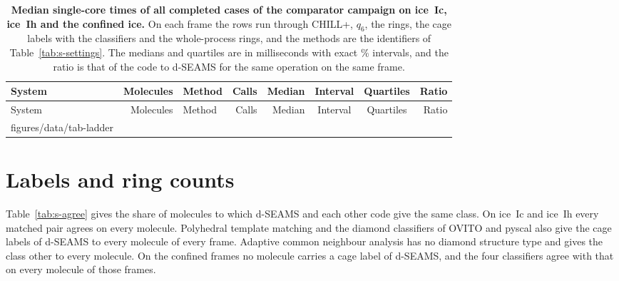 \documentclass[preprint,12pt]{elsarticle}
\makeatletter
\newcommand{\tabbody}[1]{\@@input #1 }
\makeatother
\begin{document}
\begin{landscape}
\footnotesize
\setlength{\tabcolsep}{4pt}
\setlength{\LTcapwidth}{\linewidth}
\begin{longtable}{@{}lrlrrccr@{}}
\caption{\textbf{Median single-core times of all  completed cases of the comparator campaign on ice~Ic, ice~Ih and the confined ice.}
On each frame the rows run through CHILL+, $q_6$, the rings, the cage labels with the classifiers and the whole-process rings, and the methods are the identifiers of Table~\ref{tab:s-settings}.
The medians and quartiles are in milliseconds with exact \% intervals, and the ratio is that of the code to d-SEAMS for the same operation on the same frame.}
\label{tab:s-ladder}\\
\toprule
System & Molecules & Method & Calls & Median & Interval & Quartiles & Ratio\\
\midrule
\endfirsthead
\toprule
System & Molecules & Method & Calls & Median & Interval & Quartiles & Ratio\\
\midrule
\endhead
\tabbody{figures/data/tab-ladder}
\bottomrule
\end{longtable}
\end{landscape}

\section{Labels and ring counts}
\label{sec:s-labels}

Table~\ref{tab:s-agree} gives the share of molecules to which d-SEAMS and each other code give the same class.
On ice~Ic and ice~Ih every matched pair agrees on every molecule.
Polyhedral template matching and the diamond classifiers of OVITO and pyscal also give the cage labels of d-SEAMS to every molecule of every frame.
Adaptive common neighbour analysis has no diamond structure type and gives the class other to every molecule.
On the confined frames no molecule carries a cage label of d-SEAMS, and the four classifiers agree with that on every molecule of those frames.
\end{document}
